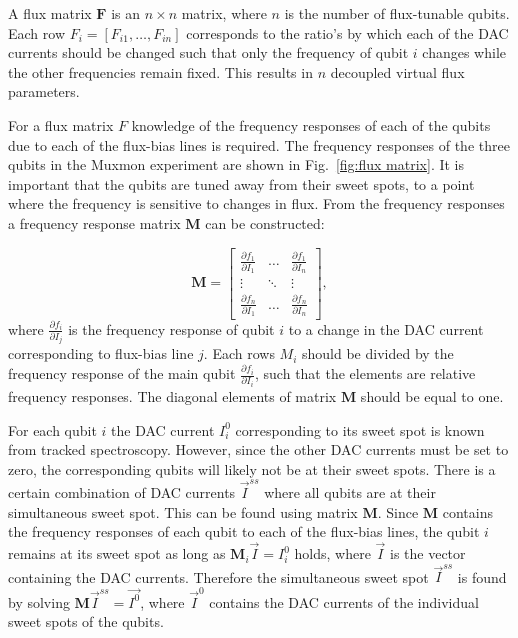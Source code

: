         A flux matrix $\boldsymbol{F}$ is an $n \times n$ matrix, where $n$ is the number of flux-tunable qubits. Each row $F_i = \left[F_{i1}, \dots, F_{in}\right]$ corresponds to the ratio's by which each of the DAC currents should be changed such that only the frequency of qubit $i$ changes while the other frequencies remain fixed. This results in $n$ decoupled virtual flux parameters.

        For a flux matrix $F$ knowledge of the frequency responses of each of the qubits due to each of the flux-bias lines is required. The frequency responses of the three qubits in the Muxmon experiment are shown in Fig.~\ref{fig:flux matrix}. It is important that the qubits are tuned away from their sweet spots, to a point where the frequency is sensitive to changes in flux. From the frequency responses a frequency response matrix $\boldsymbol{M}$ can be constructed:

        \begin{equation}
          \boldsymbol{M} =
          \begin{bmatrix}
            \frac{\partial f_1}{\partial I_1} & \dots & \frac{\partial f_1}{\partial I_n} \\
            \vdots & \ddots & \vdots \\
            \frac{\partial f_n}{\partial I_1} & \dots & \frac{\partial f_n}{\partial I_n}
          \end{bmatrix},
        \end{equation}
        where $\frac{\partial f_i}{\partial I_j}$ is the frequency response of qubit $i$ to a change in the DAC current corresponding to flux-bias line $j$. Each rows $M_i$ should be divided by the frequency response of the main qubit $\frac{\partial f_i}{\partial I_i}$, such that the elements are relative frequency responses. The diagonal elements of matrix $\boldsymbol{M}$ should be equal to one.

        For each qubit $i$ the DAC current $I^0_i$ corresponding to its sweet spot is known from tracked spectroscopy. However, since the other DAC currents must be set to zero, the corresponding qubits will likely not be at their sweet spots. There is a certain combination of DAC currents $\vec{I}^{ss}$ where all qubits are at their simultaneous sweet spot. This can be found using matrix $\boldsymbol{M}$. Since $\boldsymbol{M}$ contains the frequency responses of each qubit to each of the flux-bias lines, the qubit $i$ remains at its sweet spot as long as $\boldsymbol{M}_i \vec{I}=I^0_i$ holds, where $\vec{I}$ is the vector containing the DAC currents. Therefore the simultaneous sweet spot $\vec{I}^{ss}$ is found by solving $\boldsymbol{M} \vec{I}^{ss} = \vec{I^0}$, where $\vec{I}^0$ contains the DAC currents of the individual sweet spots of the qubits.

